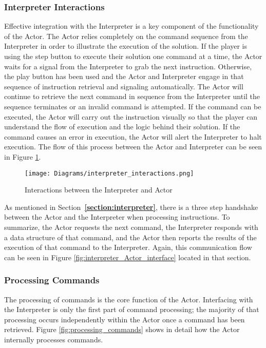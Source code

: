 \subsubsection{Interpreter Interactions}
Effective integration with the Interpreter is a key component of the functionality of the Actor. The Actor relies completely on the command sequence from the Interpreter in order to illustrate the execution of the solution. If the player is using the step button to execute their solution one command at a time, the Actor waits for a signal from the Interpreter to grab the next instruction. Otherwise, the play button has been used and the Actor and Interpreter engage in that sequence of instruction retrieval and signaling automatically. The Actor will continue to retrieve the next command in sequence from the Interpreter until the sequence terminates or an invalid command is attempted. If the command can be executed, the Actor will carry out the instruction visually so that the player can understand the flow of execution and the logic behind their solution. If the command causes an error in execution, the Actor will alert the Interpreter to halt execution. The flow of this process between the Actor and Interpreter can be seen in Figure \ref{fig:interpreter_interactions}.\\

\begin{figure}[!htb]
  \caption{Interactions between the Interpreter and Actor}
  \label{fig:interpreter_interactions}
  \centering
  \texttt{[image: Diagrams/interpreter\_interactions.png]}
\end{figure}

As mentioned in Section~\textbf{\ref{section:interpreter}}, there is a three step handshake between the Actor and the Interpreter when processing instructions. To summarize, the Actor requests the next command, the Interpreter responds with a data structure of that command, and the Actor then reports the results of the execution of that command to the Interpreter. Again, this communication flow can be seen in Figure \ref{fig:interpreter_Actor_interface} located in that section.\\

\subsubsection{Processing Commands}
The processing of commands is the core function of the Actor. Interfacing with the Interpreter is only the first part of command processing; the majority of that processing occurs independently within the Actor once a command has been retrieved. Figure \ref{fig:processing_commands} shows in detail how the Actor internally processes commands.\\


